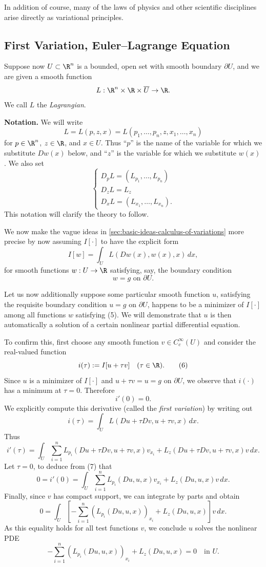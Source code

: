 In addition of course, many of the laws of physics and other scientific disciplines arise directly as variational principles.

\subsection{First Variation, Euler--Lagrange Equation}
\label{sec:first-variation-euler-lagrange}

Suppose now $U \subset \R^n$ is a bounded, open set with smooth boundary $\partial U$, and we are given a smooth function
\[
L : \R^n \times \R \times \overline{U} \to \R.
\]
We call $L$ the \textit{Lagrangian}.

\noindent\textbf{Notation.} We will write
\[
L = L(p, z, x) = L(p_1, \ldots, p_n, z, x_1, \ldots, x_n)
\]
for $p \in \R^n$, $z \in \R$, and $x \in U$. Thus ``$p$'' is the name of the variable for which we substitute $Dw(x)$ below, and ``$z$'' is the variable for which we substitute $w(x)$. We also set
\[
\begin{cases}
D_p L = (L_{p_1}, \ldots, L_{p_n}) \\
D_z L = L_z \\
D_x L = (L_{x_1}, \ldots, L_{x_n}).
\end{cases}
\]
This notation will clarify the theory to follow.

We now make the vague ideas in \cref{sec:basic-ideas-calculus-of-variations} more precise by now assuming $I[\cdot]$ to have the explicit form
\[
I[w] = \int_U L(Dw(x), w(x), x)\, dx,
\tag{4}
\]
for smooth functions $w : U \to \R$ satisfying, say, the boundary condition
\[
w = g \text{ on } \partial U.
\tag{5}
\]

Let us now additionally suppose some particular smooth function $u$, satisfying the requisite boundary condition $u = g$ on $\partial U$, happens to be a minimizer of $I[\cdot]$ among all functions $w$ satisfying (5). We will demonstrate that $u$ is then automatically a solution of a certain nonlinear partial differential equation.

To confirm this, first choose any smooth function $v \in C_c^\infty(U)$ and consider the real-valued function
\[
i(\tau) := I[u + \tau v] \quad (\tau \in \R).
\tag{6}
\]
Since $u$ is a minimizer of $I[\cdot]$ and $u + \tau v = u = g$ on $\partial U$, we observe that $i(\cdot)$ has a minimum at $\tau = 0$. Therefore
\[
i'(0) = 0.
\tag{7}
\]
We explicitly compute this derivative (called the \textit{first variation}) by writing out
\[
i(\tau) = \int_U L(Du + \tau Dv, u + \tau v, x)\, dx.
\tag{8}
\]
Thus
\[
i'(\tau) = \int_U \sum_{i=1}^n L_{p_i}(Du + \tau Dv, u + \tau v, x) v_{x_i} + L_z(Du + \tau Dv, u + \tau v, x) v \, dx.
\]
Let $\tau = 0$, to deduce from (7) that
\[
0 = i'(0) = \int_U \sum_{i=1}^n L_{p_i}(Du, u, x) v_{x_i} + L_z(Du, u, x) v \, dx.
\]
Finally, since $v$ has compact support, we can integrate by parts and obtain
\[
0 = \int_U \left[ -\sum_{i=1}^n (L_{p_i}(Du, u, x))_{x_i} + L_z(Du, u, x) \right] v \, dx.
\]
As this equality holds for all test functions $v$, we conclude $u$ solves the nonlinear PDE
\[
-\sum_{i=1}^{n}(L_{p_i}(Du, u, x))_{x_i} + L_z(Du, u, x) = 0 \quad \text{in } U.
\tag{9}
\]


